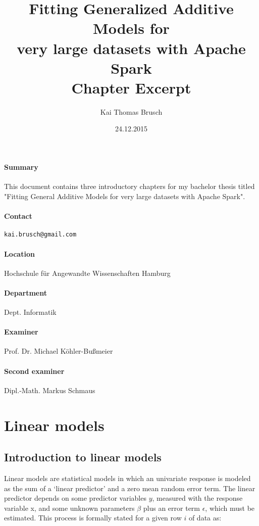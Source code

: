 \documentclass{article}
\title{
    Fitting Generalized Additive Models for\\ very large datasets with Apache Spark \\[7pt]
    \large Chapter Excerpt
}
\date{24.12.2015}
\author{Kai Thomas Brusch}
\begin{document}

    \maketitle

    \paragraph{Summary}

    This document contains three introductory chapters for my bachelor thesis titled "Fitting General Additive Models for very large datasets with Apache Spark".

    \paragraph{Contact} \texttt{kai.brusch@gmail.com}

    \paragraph{Location} Hochschule für Angewandte Wissenschaften Hamburg
    \paragraph{Department} Dept. Informatik
    \paragraph{Examiner} Prof. Dr. Michael Köhler-Bußmeier
    \paragraph{Second examiner} Dipl.-Math. Markus Schmaus

    \newpage

    \tableofcontents

    \newpage

    \section{Linear models}

    \subsection{Introduction to linear models}
    Linear models are statistical models in which an univariate response is modeled as the sum of a ‘linear predictor’ and a zero mean random error term. The linear predictor depends on some predictor variables $y$, measured with the response variable x, and some unknown parameters $\beta$ plus an error term $\epsilon$, which must be estimated. This process is formally stated for a given row  $i$ of data as: \cite{gamBook} \cite{bigdataGAM} \cite{spark}
\end{document}
